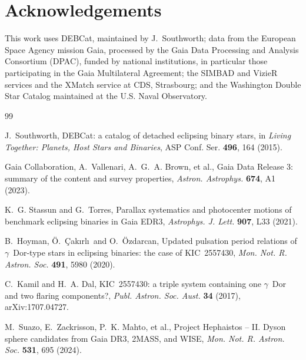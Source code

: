 \documentclass[3p,11pt]{elsarticle}
\begin{document}
\section*{Acknowledgements}

This work uses DEBCat, maintained by J.~Southworth; data from the European Space Agency
mission Gaia, processed by the Gaia Data Processing and Analysis Consortium (DPAC), funded
by national institutions, in particular those participating in the Gaia Multilateral
Agreement; the SIMBAD and VizieR services and the XMatch service at CDS, Strasbourg; and
the Washington Double Star Catalog maintained at the U.S. Naval Observatory.

\begin{thebibliography}{99}\small\raggedright
\setlength{\itemsep}{1pt}

J.~Southworth, DEBCat: a catalog of detached eclipsing binary stars, in \emph{Living
Together: Planets, Host Stars and Binaries}, ASP Conf. Ser. \textbf{496}, 164 (2015).

Gaia Collaboration, A.~Vallenari, A.~G.~A. Brown, et al., Gaia Data Release 3: summary
of the content and survey properties, \emph{Astron. Astrophys.} \textbf{674}, A1 (2023).

K.~G. Stassun and G.~Torres, Parallax systematics and photocenter motions of benchmark
eclipsing binaries in Gaia EDR3, \emph{Astrophys. J. Lett.} \textbf{907}, L33 (2021).

B.~Hoyman, \"O.~\c{C}ak\i rl\i\ and O.~\"Ozdarcan, Updated pulsation period relations of
$\gamma$~Dor-type stars in eclipsing binaries: the case of KIC~2557430, \emph{Mon. Not.
R. Astron. Soc.} \textbf{491}, 5980 (2020).

C.~Kamil and H.~A. Dal, KIC~2557430: a triple system containing one $\gamma$~Dor and two
flaring components?, \emph{Publ. Astron. Soc. Aust.} \textbf{34} (2017),
arXiv:1707.04727.

M.~Suazo, E.~Zackrisson, P.~K. Mahto, et al., Project Hephaistos -- II. Dyson sphere
candidates from Gaia DR3, 2MASS, and WISE, \emph{Mon. Not. R. Astron. Soc.}
\textbf{531}, 695 (2024).

\end{thebibliography}
\end{document}
